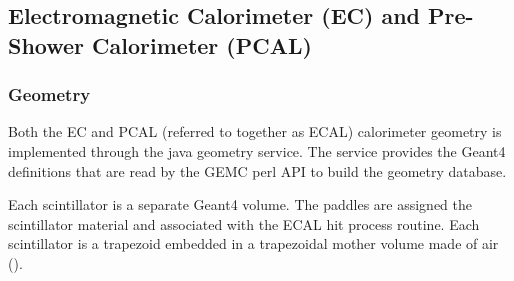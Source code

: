 \subsection{Electromagnetic Calorimeter (EC) and Pre-Shower Calorimeter (PCAL)}

\subsubsection{Geometry}

Both the EC and PCAL (referred to together as ECAL) calorimeter geometry is implemented through the java geometry service.
The service provides the Geant4 definitions that are read by the GEMC perl API to build the geometry database.

Each scintillator is a separate Geant4 volume. The paddles are assigned the scintillator material
and associated with the ECAL hit process routine.
Each scintillator is a trapezoid embedded in a trapezoidal mother volume made of air ().

